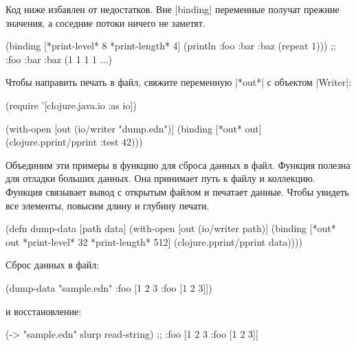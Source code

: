 Код ниже избавлен от недостатков. Вне \spverb|binding| переменные получат
прежние значения, а соседние потоки ничего не заметят.

\begin{english}
  \begin{clojure}
(binding [*print-level* 8
          *print-length* 4]
  (println {:foo {:bar {:baz (repeat 1)}}}))
;; {:foo {:bar {:baz (1 1 1 1 ...)}}}
  \end{clojure}
\end{english}

Чтобы направить печать в файл, свяжите переменную \spverb|*out*| с объектом
\spverb|Writer|:

\begin{english}
  \begin{clojure}
(require '[clojure.java.io :as io])

(with-open [out (io/writer "dump.edn")]
  (binding [*out* out]
    (clojure.pprint/pprint {:test 42})))
  \end{clojure}
\end{english}

Объединим эти примеры в функцию для сброса данных в файл. Функция полезна для
отладки больших данных. Она принимает путь к файлу и коллекцию. Функция
связывает вывод с открытым файлом и печатает данные. Чтобы увидеть все элементы,
повысим длину и глубину печати.

\begin{english}
  \begin{clojure}
(defn dump-data
  [path data]
  (with-open [out (io/writer path)]
    (binding [*out* out
              *print-level* 32
              *print-length* 512]
      (clojure.pprint/pprint data))))
  \end{clojure}
\end{english}

\noindent
Сброс данных в файл:

\begin{english}
  \begin{clojure}
(dump-data "sample.edn" {:foo [1 2 3 {:foo [1 2 3]}]})
  \end{clojure}
\end{english}

\noindent
и восстановление:

\begin{english}
  \begin{clojure}
(-> "sample.edn" slurp read-string)
;; {:foo [1 2 3 {:foo [1 2 3]}]}
  \end{clojure}
\end{english}


